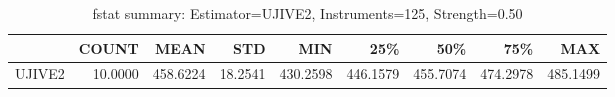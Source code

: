 \begin{table}[ht]
\centering
\caption{fstat summary: Estimator=UJIVE2, Instruments=125, Strength=0.50}
\begin{tabular}{lrrrrrrrr}
\toprule
 & COUNT & MEAN & STD & MIN & 25\% & 50\% & 75\% & MAX \\
\midrule
UJIVE2 & 10.0000 & 458.6224 & 18.2541 & 430.2598 & 446.1579 & 455.7074 & 474.2978 & 485.1499 \\
\bottomrule
\end{tabular}
\end{table}
